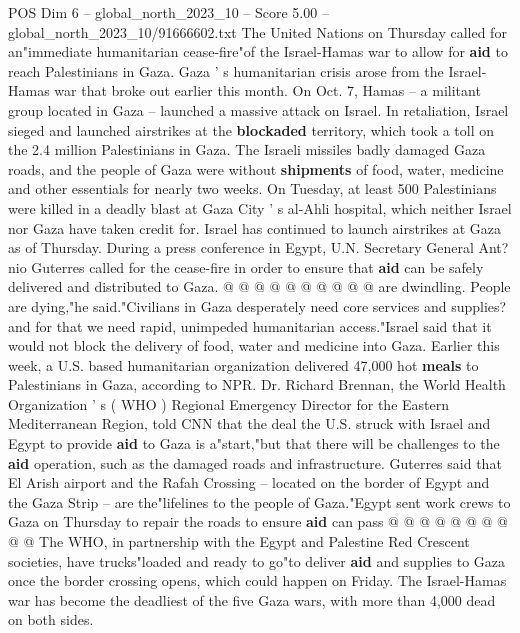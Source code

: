 \begin{textsample}{POS Dim 6 – global\_north\_2023\_10 – Score 5.00 – global\_north\_2023\_10/91666602.txt}  \label{ex:f6_pos_245}
The United Nations on Thursday called for an"immediate humanitarian cease-fire"of the Israel-Hamas war to allow for \textbf{aid} to reach Palestinians in Gaza.
Gaza ' s humanitarian crisis arose from the Israel-Hamas war that broke out earlier this month.
On Oct. 7, Hamas -- a militant group located in Gaza -- launched a massive attack on Israel.
In retaliation, Israel sieged and launched airstrikes at the \textbf{blockaded} territory, which took a toll on the 2.4 million Palestinians in Gaza.
The Israeli missiles badly damaged Gaza roads, and the people of Gaza were without \textbf{shipments} of food, water, medicine and other essentials for nearly two weeks.
On Tuesday, at least 500 Palestinians were killed in a deadly blast at Gaza City ' s al-Ahli hospital, which neither Israel nor Gaza have taken credit for.
Israel has continued to launch airstrikes at Gaza as of Thursday.
During a press conference in Egypt, U.N.
Secretary General Ant? nio Guterres called for the cease-fire in order to ensure that \textbf{aid} can be safely delivered and distributed to Gaza. @ @ @ @ @ @ @ @ @ @ are dwindling.
People are dying,"he said."Civilians in Gaza desperately need core services and supplies? and for that we need rapid, unimpeded humanitarian access."Israel said that it would not block the delivery of food, water and medicine into Gaza.
Earlier this week, a U.S. based humanitarian organization delivered 47,000 hot \textbf{meals} to Palestinians in Gaza, according to NPR.
Dr.
Richard Brennan, the World Health Organization ' s ( WHO ) Regional Emergency Director for the Eastern Mediterranean Region, told CNN that the deal the U.S. struck with Israel and Egypt to provide \textbf{aid} to Gaza is a"start,"but that there will be challenges to the \textbf{aid} operation, such as the damaged roads and infrastructure.
Guterres said that El Arish airport and the Rafah Crossing -- located on the border of Egypt and the Gaza Strip -- are the"lifelines to the people of Gaza."Egypt sent work crews to Gaza on Thursday to repair the roads to ensure \textbf{aid} can pass @ @ @ @ @ @ @ @ @ @ The WHO, in partnership with the Egypt and Palestine Red Crescent societies, have trucks"loaded and ready to go"to deliver \textbf{aid} and supplies to Gaza once the border crossing opens, which could happen on Friday.
The Israel-Hamas war has become the deadliest of the five Gaza wars, with more than 4,000 dead on both sides.

\end{textsample}
